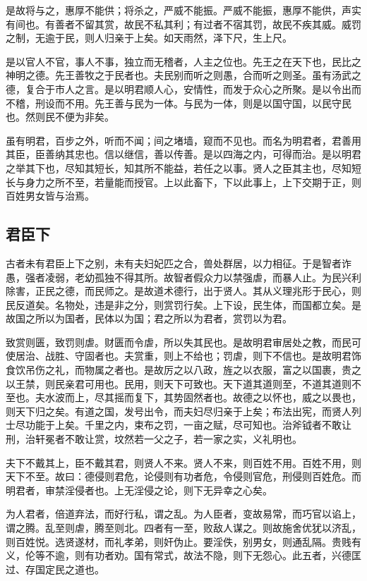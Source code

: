\documentclass[]{article}
\begin{document}
是故将与之，惠厚不能供；将杀之，严威不能振。严威不能振，惠厚不能供，声实有间也。有善者不留其赏，故民不私其利；有过者不宿其罚，故民不疾其威。威罚之制，无逾于民，则人归亲于上矣。如天雨然，泽下尺，生上尺。

是以官人不官，事人不事，独立而无稽者，人主之位也。先王之在天下也，民比之神明之德。先王善牧之于民者也。夫民别而听之则愚，合而听之则圣。虽有汤武之德，复合于市人之言。是以明君顺人心，安情性，而发于众心之所聚。是以令出而不稽，刑设而不用。先王善与民为一体。与民为一体，则是以国守国，以民守民也。然则民不便为非矣。

虽有明君，百步之外，听而不闻；间之堵墙，窥而不见也。而名为明君者，君善用其臣，臣善纳其忠也。信以继信，善以传善。是以四海之内，可得而治。是以明君之举其下也，尽知其短长，知其所不能益，若任之以事。贤人之臣其主也，尽知短长与身力之所不至，若量能而授官。上以此畜下，下以此事上，上下交期于正，则百姓男女皆与治焉。

\hypertarget{header-n421}{%
\subsection{君臣下}\label{header-n421}}

古者未有君臣上下之别，未有夫妇妃匹之合，兽处群居，以力相征。于是智者诈愚，强者凌弱，老幼孤独不得其所。故智者假众力以禁强虐，而暴人止。为民兴利除害，正民之德，而民师之。是故道术德行，出于贤人。其从义理兆形于民心，则民反道矣。名物处，违是非之分，则赏罚行矣。上下设，民生体，而国都立矣。是故国之所以为国者，民体以为国；君之所以为君者，赏罚以为君。

致赏则匮，致罚则虐。财匮而令虐，所以失其民也。是故明君审居处之教，而民可使居治、战胜、守固者也。夫赏重，则上不给也；罚虐，则下不信也。是故明君饰食饮吊伤之礼，而物属之者也。是故厉之以八政，旌之以衣服，富之以国裹，贵之以王禁，则民亲君可用也。民用，则天下可致也。天下道其道则至，不道其道则不至也。夫水波而上，尽其摇而复下，其势固然者也。故德之以怀也，威之以畏也，则天下归之矣。有道之国，发号出令，而夫妇尽归亲于上矣；布法出宪，而贤人列士尽功能于上矣。千里之内，束布之罚，一亩之赋，尽可知也。治斧钺者不敢让刑，治轩冕者不敢让赏，坟然若一父之子，若一家之实，义礼明也。

夫下不戴其上，臣不戴其君，则贤人不来。贤人不来，则百姓不用。百姓不用，则天下不至。故曰：德侵则君危，论侵则有功者危，令侵则官危，刑侵则百姓危。而明君者，审禁淫侵者也。上无淫侵之论，则下无异幸之心矣。

为人君者，倍道弃法，而好行私，谓之乱。为人臣者，变故易常，而巧官以谄上，谓之腾。乱至则虐，腾至则北。四者有一至，败敌人谋之。则故施舍优犹以济乱，则百姓悦。选贤遂材，而礼孝弟，则奸伪止。要淫佚，别男女，则通乱隔。贵贱有义，伦等不逾，则有功者劝。国有常式，故法不隐，则下无怨心。此五者，兴德匡过、存国定民之道也。
\end{document}
